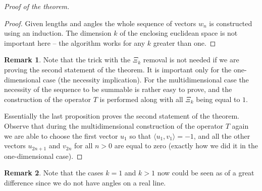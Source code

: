\documentclass[12pt]{article}
\theoremstyle{definition}
\newtheorem{remark}{Remark}
\numberwithin{remark}{section}
\numberwithin{theorem}{section}
\numberwithin{prop}{section}
\numberwithin{equation}{section}
\numberwithin{lemma}{section}
\numberwithin{prop_under_lemma}{lemma}
\begin{document}
\begin{proof}[Proof of the theorem]
\begin{proof}
            Given lengths and angles the whole sequence of vectors $w_n$ is constructed using an induction.
            The dimension $k$ of the enclosing euclidean space is not important here -- the algorithm works 
            for any $k$ greater than one.
        \end{proof}
        \begin{remark}
            Note that the trick with the $\Xi_k$ removal is not needed if we are proving the second statement of the theorem.
            It is important only for the one-dimensional case (the necessity implication).
            For the multidimensional case the necessity of
            the sequence to be summable is rather easy to prove, and the construction of the operator $T$ is
            performed along with all $\Xi_k$ being equal to $1$.
        \end{remark}
        Essentially the last proposition proves the second statement of the theorem.
        Observe that during the multidimensional construction of the operator $T$ again
        we are able to choose the first vector $u_1$ so that $\langle u_1,v_1 \rangle = -1$,
        and all the other vectors $u_{2n+1}$ and $v_{2n}$ for all $n>0$ are equal to zero (exactly how we did it in the 
        one-dimensional case).
    \end{proof}
    \begin{remark}
        Note that the cases $k=1$ and $k > 1$ now could be seen as of a great difference since we do not have angles
        on a real line.
    \end{remark}
\end{document}

